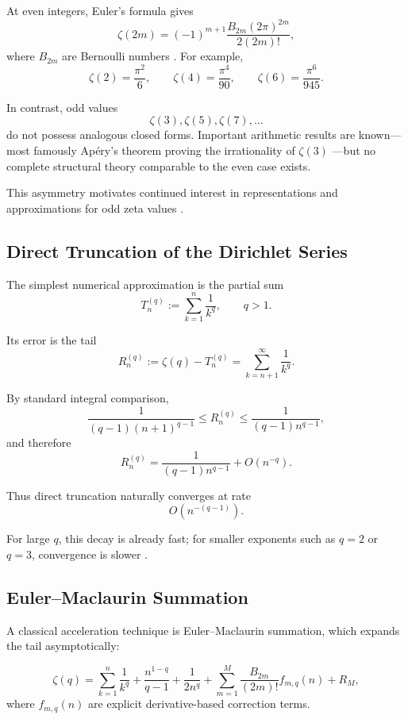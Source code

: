 \documentclass[11pt]{article}
\numberwithin{equation}{section}
\theoremstyle{definition}
\begin{document}
At even integers, Euler's formula gives
\[
\zeta(2m)=(-1)^{m+1}\frac{B_{2m}(2\pi)^{2m}}{2(2m)!},
\]
where \(B_{2m}\) are Bernoulli numbers \cite{apostol1976analytic}. For example,
\[
\zeta(2)=\frac{\pi^2}{6},
\qquad
\zeta(4)=\frac{\pi^4}{90},
\qquad
\zeta(6)=\frac{\pi^6}{945}.
\]

In contrast, odd values
\[
\zeta(3),\zeta(5),\zeta(7),\dots
\]
do not possess analogous closed forms. Important arithmetic results are known---most famously Apéry's theorem proving the irrationality of \(\zeta(3)\) \cite{apery1979irrationalite}---but no complete structural theory comparable to the even case exists.

This asymmetry motivates continued interest in representations and approximations for odd zeta values \cite{borwein2013pi}.

\subsection{Direct Truncation of the Dirichlet Series}

The simplest numerical approximation is the partial sum
\[
T_n^{(q)}:=\sum_{k=1}^{n}\frac{1}{k^q},
\qquad q>1.
\]

Its error is the tail
\[
R_n^{(q)}:=\zeta(q)-T_n^{(q)}
=
\sum_{k=n+1}^{\infty}\frac1{k^q}.
\]

By standard integral comparison,
\[
\frac{1}{(q-1)(n+1)^{q-1}}
\le
R_n^{(q)}
\le
\frac{1}{(q-1)n^{q-1}},
\]
and therefore
\[
R_n^{(q)}
=
\frac{1}{(q-1)n^{q-1}}+O(n^{-q}).
\]

Thus direct truncation naturally converges at rate
\[
O(n^{-(q-1)}).
\]

For large \(q\), this decay is already fast; for smaller exponents such as \(q=2\) or \(q=3\), convergence is slower \cite{knopp1990theory}.

\subsection{Euler--Maclaurin Summation}

A classical acceleration technique is Euler--Maclaurin summation, which expands the tail asymptotically:

\[
\zeta(q)
=
\sum_{k=1}^{n}\frac1{k^q}
+
\frac{n^{1-q}}{q-1}
+
\frac{1}{2n^q}
+
\sum_{m=1}^{M}
\frac{B_{2m}}{(2m)!}
f_{m,q}(n)
+
R_M,
\]
where \(f_{m,q}(n)\) are explicit derivative-based correction terms.
\end{document}
